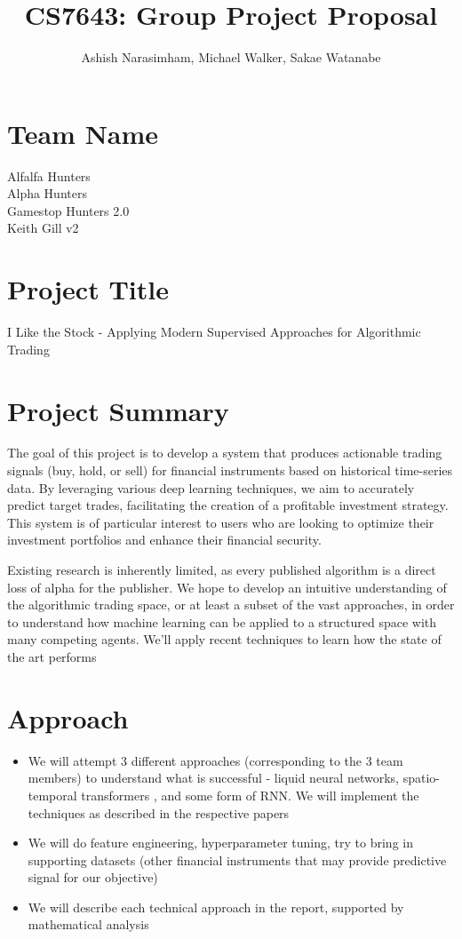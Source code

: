 \documentclass[
	letterpaper, %
]{jdf}
\author{Ashish Narasimham, Michael Walker, Sakae Watanabe}
\title{CS7643: Group Project Proposal}
\begin{document}
\maketitle

\section*{Team Name}

Alfalfa Hunters \\
Alpha Hunters \\
Gamestop Hunters 2.0 \\
Keith Gill v2 \\

\section*{Project Title}

I Like the Stock - Applying Modern Supervised Approaches for Algorithmic Trading

\section*{Project Summary}
The goal of this project is to develop a system that produces actionable trading signals (buy, hold, or sell) for financial instruments based on historical time-series data. By leveraging various deep learning techniques, we aim to accurately predict target trades, facilitating the creation of a profitable investment strategy. This system is of particular interest to users who are looking to optimize their investment portfolios and enhance their financial security.

Existing research is inherently limited, as every published algorithm is a direct loss of alpha for the publisher. We hope to develop an intuitive understanding of the algorithmic trading space, or at least a subset of the vast approaches, in order to understand how machine learning can be applied to a structured space with many competing agents. We’ll apply recent techniques to learn how the state of the art performs


\section*{Approach}

\begin{itemize}
    \item We will attempt 3 different approaches (corresponding to the 3 team members) to understand what is successful - liquid neural networks, spatio-temporal transformers , and some form of RNN. We will implement the techniques as described in the respective papers
    \item We will do feature engineering, hyperparameter tuning, try to bring in supporting datasets (other financial instruments that may provide predictive signal for our objective)
    \item We will describe each technical approach in the report, supported by mathematical analysis
\end{itemize}
\end{document}
